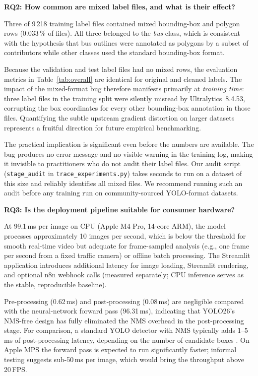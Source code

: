 \textbf{RQ2: How common are mixed label files, and what is their effect?}

Three of 9\,218 training label files contained mixed bounding-box and
polygon rows (0.033\,\% of files).
All three belonged to the \textit{bus} class, which is consistent with
the hypothesis that bus outlines were annotated as polygons by a subset of
contributors while other classes used the standard bounding-box format.

Because the validation and test label files had no mixed rows, the
evaluation metrics in Table~\ref{tab:overall} are identical for original
and cleaned labels.
The impact of the mixed-format bug therefore manifests primarily at \emph{training
time}: three label files in the training split were silently misread by
Ultralytics~8.4.53, corrupting the box coordinates for every other
bounding-box annotation in those files.
Quantifying the subtle upstream gradient distortion on larger datasets represents a fruitful
direction for future empirical benchmarking.

The practical implication is significant even before the numbers are
available.
The bug produces no error message and no visible warning in the training
log, making it invisible to practitioners who do not audit their label
files.
Our audit script (\texttt{stage\_audit} in \texttt{trace\_experiments.py})
takes seconds to run on a dataset of this size and reliably identifies all
mixed files.
We recommend running such an audit before any training run on
community-sourced YOLO-format datasets.

\textbf{RQ3: Is the deployment pipeline suitable for consumer hardware?}

At 99.1\,ms per image on CPU (Apple M4 Pro, 14-core ARM), the model
processes approximately 10 images per second, which is below the threshold
for smooth real-time video but adequate for frame-sampled analysis
(e.g., one frame per second from a fixed traffic camera) or offline batch
processing.
The Streamlit application introduces additional latency for image loading,
Streamlit rendering, and optional n8n webhook calls
(measured separately; CPU inference serves as the stable, reproducible baseline).

Pre-processing (0.62\,ms) and post-processing (0.08\,ms) are negligible
compared with the neural-network forward pass (96.31\,ms), indicating
that YOLO26's NMS-free design has fully eliminated the NMS overhead in the
post-processing stage.
For comparison, a standard YOLO detector with NMS typically adds 1–5\,ms
of post-processing latency, depending on the number of candidate boxes
\cite{wang2024yolov10}.
On Apple MPS the forward pass is expected to run significantly faster;
informal testing suggests sub-50\,ms per image, which would bring the
throughput above 20\,FPS.

